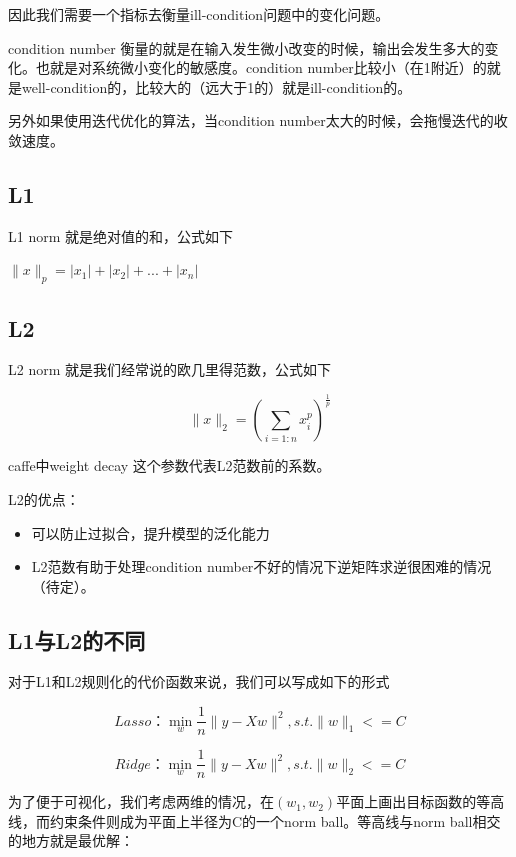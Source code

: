 	因此我们需要一个指标去衡量ill-condition问题中的变化问题。
	
	condition number 衡量的就是在输入发生微小改变的时候，输出会发生多大的变化。也就是对系统微小变化的敏感度。condition number比较小（在1附近）的就是well-condition的，比较大的（远大于1的）就是ill-condition的。
	
	另外如果使用迭代优化的算法，当condition number太大的时候，会拖慢迭代的收敛速度。
	
	\subsection{L1}
	L1 norm 就是绝对值的和，公式如下
	
	$\|x\|_p = |x_1|+|x_2|+...+|x_n|$
	
	\subsection{L2}
	L2 norm 就是我们经常说的欧几里得范数，公式如下
	
	\begin{equation}
		\|x\|_2 = (\sum_{i=1:n}x_i ^{p})^{\frac{1}{p}}
	\end{equation}
	
	caffe中weight decay 这个参数代表L2范数前的系数。
	
	L2的优点：
	\begin{itemize}
		\item 可以防止过拟合，提升模型的泛化能力
		\item L2范数有助于处理condition number不好的情况下逆矩阵求逆很困难的情况（待定）。
	\end{itemize}

	
	
	\subsection{L1与L2的不同}
	对于L1和L2规则化的代价函数来说，我们可以写成如下的形式
	
	\begin{equation}
		Lasso：\min_{w} \frac{1}{n} \|y-Xw\|^2,s.t.\|w\|_1<=C
	\end{equation}
	
	\begin{equation}
		Ridge：\min_{w} \frac{1}{n} \|y-Xw\|^2,s.t.\|w\|_2<=C
	\end{equation}
	
	为了便于可视化，我们考虑两维的情况，在$(w_1,w_2)$平面上画出目标函数的等高线，而约束条件则成为平面上半径为C的一个norm ball。等高线与norm ball相交的地方就是最优解：
	
